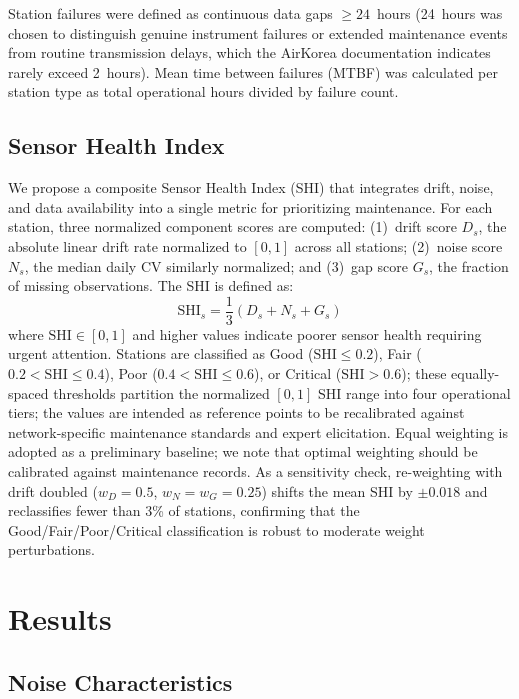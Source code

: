 \documentclass[12pt]{article}
\begin{document}
Station failures were defined as continuous data gaps ${\geq}24$~hours (24~hours was chosen to distinguish genuine instrument failures or extended maintenance events from routine transmission delays, which the AirKorea documentation indicates rarely exceed 2~hours). Mean time between failures (MTBF) was calculated per station type as total operational hours divided by failure count.

\subsection{Sensor Health Index}

We propose a composite Sensor Health Index (SHI) that integrates drift, noise, and data availability into a single metric for prioritizing maintenance. For each station, three normalized component scores are computed: (1)~drift score $D_s$, the absolute linear drift rate normalized to $[0, 1]$ across all stations; (2)~noise score $N_s$, the median daily CV similarly normalized; and (3)~gap score $G_s$, the fraction of missing observations. The SHI is defined as:
\begin{equation}
\text{SHI}_s = \frac{1}{3}(D_s + N_s + G_s)
\label{eq:shi}
\end{equation}
where $\text{SHI} \in [0, 1]$ and higher values indicate poorer sensor health requiring urgent attention. Stations are classified as Good ($\text{SHI} \leq 0.2$), Fair ($0.2 < \text{SHI} \leq 0.4$), Poor ($0.4 < \text{SHI} \leq 0.6$), or Critical ($\text{SHI} > 0.6$); these equally-spaced thresholds partition the normalized $[0,1]$ SHI range into four operational tiers; the values are intended as reference points to be recalibrated against network-specific maintenance standards and expert elicitation. Equal weighting is adopted as a preliminary baseline; we note that optimal weighting should be calibrated against maintenance records. As a sensitivity check, re-weighting with drift doubled ($w_D = 0.5$, $w_N = w_G = 0.25$) shifts the mean SHI by ${\pm}0.018$ and reclassifies fewer than 3\% of stations, confirming that the Good/Fair/Poor/Critical classification is robust to moderate weight perturbations.

\section{Results}

\subsection{Noise Characteristics}\label{sec:noise}
\end{document}
